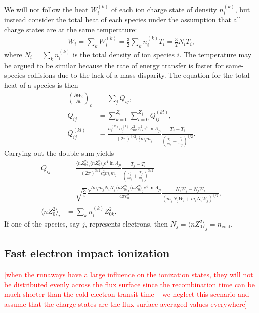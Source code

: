 \documentclass[11pt,a4paper]{article}
\newcommand{\sub}[1]{\ensuremath{_{\text{#1}}}}
\begin{document}
We will not follow the heat $W_i^{(k)}$ of each ion charge state of density $n_i^{(k)}$, but instead consider the total heat of each species under the assumption that all charge states are at the same temperature:
\begin{align}
W_i = \sum_k W_i^{(k)} = \frac{3}{2}\sum_k n_i^{(k)} T_i = \frac{3}{2}N_iT_i,
\end{align}
where $N_i = \sum_k n_i^{(k)}$ is the total density of ion species $i$. The temperature may be argued to be similar because the rate of energy transfer is faster for same-species collisions due to the lack of a mass disparity. The equation for the total heat of a species is then
\begin{align}
\left(\frac{\partial W_i}{\partial t}\right)_c &= \sum_j  Q_{ij}, \nonumber\\
Q_{ij} &= \sum_{k=0}^{Z_i}\sum_{l=0}^{Z_j} Q_{ij}^{(kl)}, \nonumber \\
Q_{ij}^{(kl)} &= \frac{n_i^{(k)} n_j^{(l)} Z_{0k}^2 Z_{0l}^2 e^4 \ln\Lambda_{ji}}{(2\pi)^{3/2}\varepsilon_0^2 m_i m_j}\frac{T_j-T_i}{\left(\frac{T_i}{m_i}+\frac{T_j}{m_j}\right)^{3/2}}.
\end{align}
Carrying out the double sum yields
\begin{align}
Q_{ij} &= \frac{\langle n Z_0^2\rangle_i \langle nZ_0^2\rangle_j  e^4 \ln\Lambda_{ji}}{(2\pi)^{3/2}\varepsilon_0^2 m_i m_j}\frac{T_j-T_i}{\left(\frac{T_i}{m_i}+\frac{T_j}{m_j}\right)^{3/2}} \nonumber \\
&= \sqrt{\frac{3}{\pi}}\frac{\sqrt{m_im_j N_i N_j}\langle n Z_0^2\rangle_i \langle nZ_0^2\rangle_j  e^4 \ln\Lambda_{ji}  }{ 4\pi\varepsilon_0^2}\frac{N_i W_j - N_j W_i}{(m_j N_j W_i + m_i N_i W_j)^{3/2}}, \nonumber \\
\langle n Z_0^2\rangle_i &= \sum_k n_i^{(k)} Z_{0k}^2.
\end{align}
If one of the species, say $j$, represents electrons, then $N_j = \langle nZ_0^2 \rangle_j = n\sub{cold}$.

\subsection{Fast electron impact ionization}
\textcolor{red}{[when the runaways have a large influence on the ionization states, they will not be distributed evenly across the flux surface since the recombination time can be much shorter than the cold-electron transit time -- we neglect this scenario and assume that the charge states are the flux-surface-averaged values everywhere]}
\end{document}
